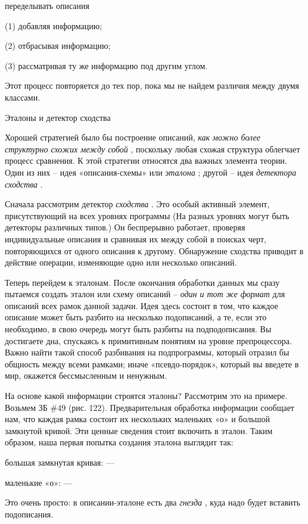 \documentclass[../main.tex]{subfiles}
\begin{document}
переделывать описания

(1) добавляя информацию;

(2) отбрасывая информацию;

(3) рассматривая ту же информацию под другим углом.

Этот процесс повторяется до тех пор, пока мы не найдем различия между двумя классами.

Эталоны и детектор сходства

Хорошей стратегией было бы построение описаний, \emph{как можно более структурно схожих между собой} , поскольку любая схожая структура облегчает процесс сравнения. К этой стратегии относятся два важных элемента теории. Один из них \--- идея «описания-схемы» или \emph{эталона} ; другой \--- идея \emph{детектора сходства} .

Сначала рассмотрим детектор \emph{сходства} . Это особый активный элемент, присутствующий на всех уровнях программы (На разных уровнях могут быть детекторы различных типов.) Он беспрерывно работает, проверяя индивидуальные описания и сравнивая их между собой в поисках черт, повторяющихся от одного описания к другому. Обнаружение сходства приводит в действие операции, изменяющие одно или несколько описаний.

Теперь перейдем к эталонам. После окончания обработки данных мы сразу пытаемся создать эталон или схему описаний \--- \emph{один и тот же формат} для описаний всех рамок данной задачи. Идея здесь состоит в том, что каждое описание может быть разбито на несколько подописаний, а те, если это необходимо, в свою очередь могут быть разбиты на подподописания. Вы достигаете дна, спускаясь к примитивным понятиям на уровне препроцессора. Важно найти такой способ разбивания на подпрограммы, который отразил бы общность между всеми рамками; иначе «псевдо-порядок», который вы введете в мир, окажется бессмысленным и ненужным.

На основе какой информации строятся эталоны? Рассмотрим это на примере. Возьмем ЗБ \#49 (рис. 122). Предварительная обработка информации сообщает нам, что каждая рамка состоит их нескольких маленьких «о» и большой замкнутой кривой. Эти ценные сведения стоит включить в эталон. Таким образом, наша первая попытка создания эталона выглядит так:

большая замкнутая кривая: ---

маленькие «о»: ---

Это очень просто: в описании-эталоне есть два \emph{гнезда} , куда надо будет вставить подописания.
\end{document}
